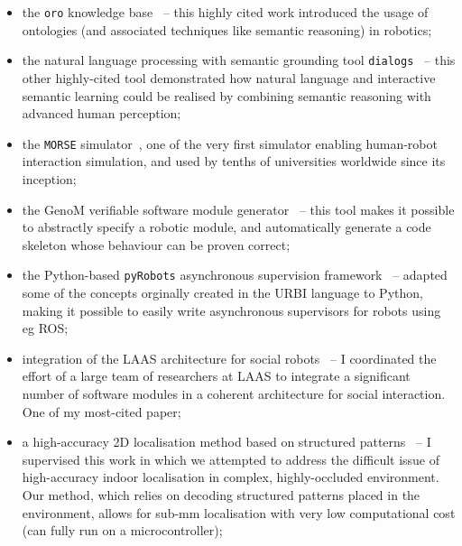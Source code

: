 \begin{itemize}
    \item the \texttt{oro} knowledge base~\autocite{lemaignan2010oro} --
        this highly cited work introduced the usage of ontologies (and
        associated techniques like semantic reasoning) in robotics;

    \item the natural language processing with semantic grounding tool
        \texttt{dialogs}~\autocite{lemaignan2011grounding} -- this other
        highly-cited tool demonstrated how natural language and interactive
        semantic learning could be realised by combining semantic reasoning with
        advanced human perception;

    \item the \texttt{MORSE} simulator~\autocite{echeverria2011morse,
        lemaignan2012morse}, one of the very first simulator enabling
        human-robot interaction simulation, and used by tenths of universities
        worldwide since its inception;

    \item the GenoM verifiable software module
        generator~\autocite{mallet2010genom3} -- this tool makes it possible to
        abstractly specify a robotic module, and automatically generate a code
        skeleton whose behaviour can be proven correct;

    \item the Python-based \texttt{pyRobots} asynchronous supervision
        framework~\autocite{lemaignan2015pyrobots} -- adapted some of the concepts
        orginally created in the URBI language to Python, making it possible to
        easily write asynchronous supervisors for robots using eg ROS;

    \item integration of the LAAS architecture for social
        robots~\autocite{lemaignan2017artificial} -- I coordinated the effort of
        a large team of researchers at LAAS to integrate a significant number of
        software modules in a coherent architecture for social interaction. One
        of my most-cited paper;

    \item a high-accuracy 2D localisation method based on structured
        patterns~\autocite{hostettler2016realtime} -- I supervised this work
        in which we attempted to address the difficult issue of high-accuracy
        indoor localisation in complex, highly-occluded environment. Our method,
        which relies on decoding structured patterns placed in the environment,
        allows for sub-mm localisation with very low computational cost (can
        fully run on a microcontroller);


\end{itemize}
